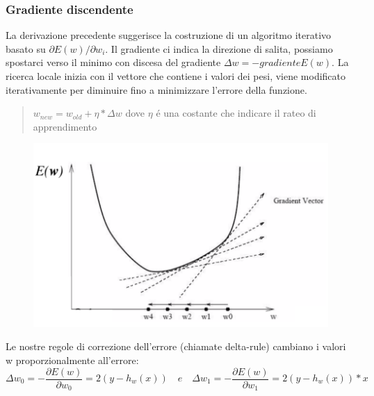 \documentclass{article}
\begin{document}
\subsubsection{Gradiente discendente}
La derivazione precedente suggerisce la costruzione di un algoritmo iterativo basato su $\partial E(w) / \partial w_i$. Il gradiente ci indica la direzione di salita, possiamo spostarci verso il minimo con discesa del gradiente $\Delta w = - gradienteE(w)$. La ricerca locale inizia con il vettore che contiene i valori dei pesi, viene modificato iterativamente per diminuire fino a minimizzare l'errore della funzione.
\begin{quote}
    $w_{new} = w_{old} + \eta * \Delta w$ dove $\eta$ é una costante che indicare il rateo di apprendimento
\end{quote}
\begin{figure}[H]
    \centering
    \includegraphics[scale=0.5]{Images/gradientvector.png}
\end{figure}

Le nostre regole di correzione dell'errore (chiamate delta-rule) cambiano i valori w proporzionalmente all'errore:
\begin{equation}
    \Delta w_0 = - \frac{\partial E(w)}{\partial w_0} = 2(y - h_w(x)) \quad e \quad \Delta w_1 = - \frac{\partial E(w)}{\partial w_1} = 2(y - h_w(x)) * x
\end{equation}
\end{document}
